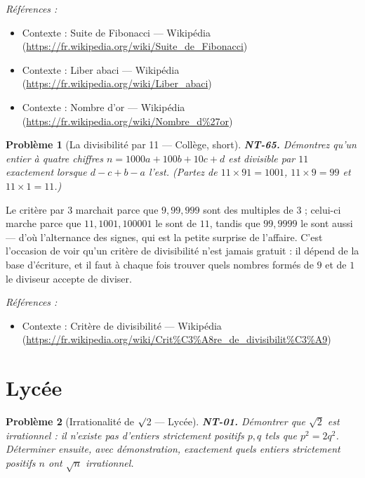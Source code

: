 \documentclass[11pt]{article}
\newtheorem{problem}{Problème}
\newenvironment{refs}{\par\small\noindent\emph{Références :}\begin{itemize}\setlength\itemsep{0pt}}{\end{itemize}\normalsize}
\begin{document}
\begin{refs}
\item Contexte : Suite de Fibonacci --- Wikipédia (\url{https://fr.wikipedia.org/wiki/Suite_de_Fibonacci})
\item Contexte : Liber abaci --- Wikipédia (\url{https://fr.wikipedia.org/wiki/Liber_abaci})
\item Contexte : Nombre d'or --- Wikipédia (\url{https://fr.wikipedia.org/wiki/Nombre_d%27or})
\end{refs}

\bigskip

\begin{problem}[{La divisibilité par 11 --- Collège, short}]
\textbf{NT-65.} Démontrez qu'un entier à quatre chiffres
$ n = 1000a + 100b + 10c + d $ est divisible par $ 11 $ exactement lorsque $ d - c + b - a $
l'est. (Partez de $ 11 \times 91 = 1001 $, $ 11 \times 9 = 99 $ et $ 11 \times 1 = 11 $.)
\end{problem}

\noindent Le critère par $ 3 $ marchait parce que $ 9, 99, 999 $ sont des multiples de
$ 3 $ ; celui-ci marche parce que $ 11, 1001, 100001 $ le sont de $ 11 $, tandis que
$ 99, 9999 $ le sont aussi --- d'où l'alternance des signes, qui est la petite surprise de l'affaire.
C'est l'occasion de voir qu'un critère de divisibilité n'est jamais gratuit : il dépend de la base
d'écriture, et il faut à chaque fois trouver quels nombres formés de $ 9 $ et de $ 1 $ le diviseur
accepte de diviser.

\begin{refs}
\item Contexte : Critère de divisibilité --- Wikipédia (\url{https://fr.wikipedia.org/wiki/Crit%C3%A8re_de_divisibilit%C3%A9})
\end{refs}

\bigskip


\section*{Lycée}

\begin{problem}[{Irrationalité de $\surd$2 --- Lycée}]
\textbf{NT-01.} Démontrer que $\sqrt{2}$ est irrationnel : il n'existe pas
d'entiers strictement positifs $p, q$ tels que $p^2 = 2q^2$. Déterminer ensuite, avec
démonstration, exactement quels entiers strictement positifs $n$ ont $\sqrt{n}$ irrationnel.
\end{problem}
\end{document}
